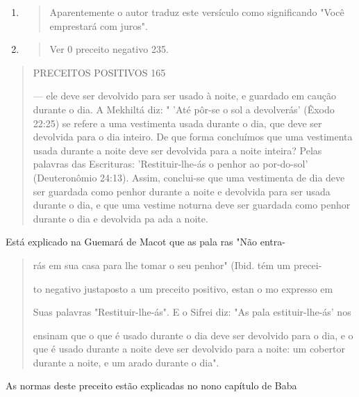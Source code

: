 \begin{enumerate}
\def\labelenumi{\arabic{enumi}.}
\setcounter{enumi}{200}
\item
  \begin{quote}
  Aparentemente o autor traduz este versículo como significando "Você
  emprestará com juros".
  \end{quote}
\item
  \begin{quote}
  Ver 0 preceito negativo 235.
  \end{quote}
\end{enumerate}

\begin{quote}
PRECEITOS POSITIVOS 165

--- ele deve ser devolvido para ser usado à noite, e guardado em caução
duran­te o dia. A Mekhiltá diz: " 'Até pôr-se o sol a devolverás' (Êxodo
22:25) se refe­re a uma vestimenta usada durante o dia, que deve ser
devolvida para o dia inteiro. De que forma concluímos que uma vestimenta
usada durante a noite deve ser devolvida para a noite inteira? Pelas
palavras das Escrituras: 'Restituir-lhe-ás o penhor ao por-do-sol'
(Deuteronômio 24:13). Assim, conclui-se que uma vestimenta de dia deve
ser guardada como penhor durante a noite e de­volvida para ser usada
durante o dia, e que uma vestime noturna deve ser guardada como penhor
durante o dia e devolvida pa ada a noite.
\end{quote}

Está explicado na Guemará de Macot que as pala ras "Não entra-

\begin{quote}
rás em sua casa para lhe tomar o seu penhor" (Ibid. tém um precei-

to negativo justaposto a um preceito positivo, estan o mo expresso em

Suas palavras "Restituir-lhe-ás". E o Sifrei diz: "As pala
estituir-lhe-ás' nos

ensinam que o que é usado durante o dia deve ser devolvido para o dia, e
o que é usado durante a noite deve ser devolvido para a noite: um
cobertor du­rante a noite, e um arado durante o dia".
\end{quote}

As normas deste preceito estão explicadas no nono capítulo de Baba


